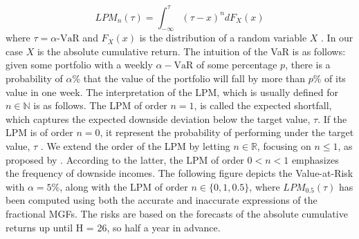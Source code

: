 \begin{equation}
    LPM_n(\tau) = \int_{-\infty}^{\tau} ( \tau - x)^n dF_X(x)
\end{equation}
 where \(\tau = \alpha\text{-VaR}\) and \(F_X(x)\) is the distribution of a random variable \(X\) \citep{wojt2009}. In our case \(X\) is the absolute cumulative return.  The intuition of the VaR is as follows: given some portfolio with a weekly \(\alpha-\text{VaR}\) of some percentage \(p\), there is a
probability of \(\alpha\)\% that the value of the portfolio will fall by more than \(p\)\% of its value in one week. The interpretation of the LPM, which is usually defined for \(n \in \mathbb{N}\) is as follows. The LPM of order \( n = 1\), is called the expected shortfall, which captures the expected downside deviation below the target value, \(\tau\). If the LPM is of order \( n = 0\), it represent the probability of performing under the target value, \(\tau\) \citep{sortino2001}. We extend the order of the LPM by letting \(n \in \mathbb{R}\), focusing on \( n \leq 1\), as proposed by \citet{fishburn1977}. According to the latter, the LPM of order \( 0 < n < 1\) emphasizes the frequency of downside incomes. The following figure depicts the Value-at-Risk with \(\alpha = 5\)\%, along with the LPM of order \(n \in \{0, 1, 0.5\}\), where \(LPM_{0.5}(\tau)\) has been computed using both the accurate and inaccurate expressions of the fractional MGFs. The risks are based on the forecasts of the absolute cumulative returns up until H = 26, so half a year in advance.

